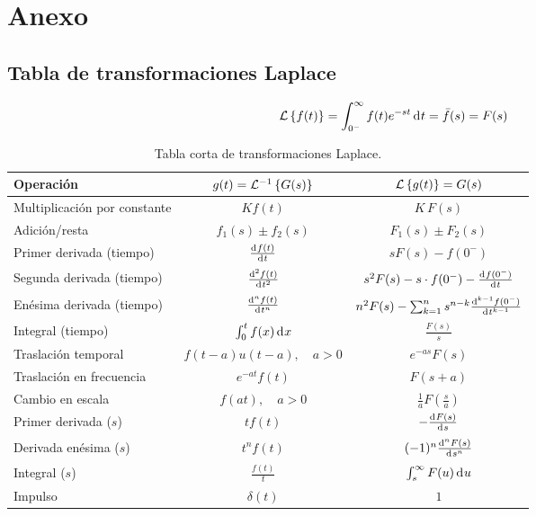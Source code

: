 \chapter{Anexo}

\section{Tabla de transformaciones Laplace}
\[
\lapc{f(t)} = \int_{0^-}^{\infty}f(t) e^{-st}\diff t = \bar{f}(s) = F(s)
\]
\begin{table}[htb!]
	\centering
	\caption{Tabla corta de transformaciones Laplace.}

	\begin{tabular}{lcc}
		Operación & $g(t)=\mathcal{L}^{-1} \left\{G(s)\right\}$ & $\mathcal{L} \left\{g(t)\right\} = G(s)$ \\ [4pt]\hline
		Multiplicación por constante & $Kf(t)$ & $K\,F(s)$ \\[10pt]
		Adición/resta & $f_1(s) \pm f_2(s)$ & $F_1(s) \pm F_2(s)$ \\[10pt]
		Primer derivada (tiempo) & $\frac{\diff f(t)}{\diff t}$ & $sF(s) - f(0^-)$ \\[10pt]
		Segunda derivada (tiempo) & $\frac{\diff^2 f(t)}{\diff t^2}$ & $s^2F(s) - s\cdot f(0^-) - \frac{\diff f(0^-)}{\diff t}$ \\[10pt]
		Enésima derivada (tiempo) & $\frac{\diff^n f(t)}{\diff t^n}$ & $n^2F(s) - \sum^{n}_{k=1} s^{n-k} \frac{\diff^{k-1} f(0^-)}{\diff t ^{k-1}}$ \\[10pt]
		Integral (tiempo)  &  $\int_0^t f(x)\diff x$  & $\frac{F(s)}{s}$ \\[10pt]
		Traslación temporal & $f(t-a) u(t-a),\quad a>0$ &  $e^{-as}F(s)$ \\[10pt]
		Traslación en frecuencia &  $e^{-at}f(t) $  & $F(s+a)$ \\[10pt]
		Cambio en escala  &  $f(at), \quad a>0 $ & $\frac{1}{a}F(\frac{s}{a}) $ \\[10pt]
		Primer derivada ($s$) & $tf(t)$  &  $-\frac{\diff F(s)}{\diff s}$ \\[10pt]
		Derivada enésima ($s$) & $t^n f(t)$  & $(-1)^n \frac{\diff^n F(s)}{\diff s ^n}$ \\ [10pt]
		Integral ($s$) & $\frac{f(t)}{t} $  &  $\int^\infty_s F(u) \diff u $ \\ [10pt]
		Impulso & $\delta(t)$ & $1$ 
	\end{tabular}
\end{table}


